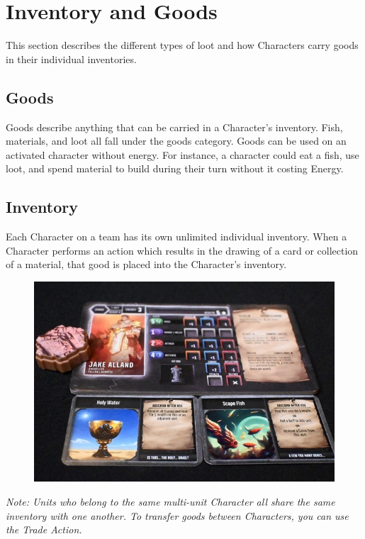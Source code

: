 \documentclass[../main.tex]{subfiles}
\begin{document}
\section{Inventory and Goods}
This section describes the different types of loot and how Characters carry goods in their individual inventories.

\subsection{Goods}
Goods describe anything that can be carried in a Character’s inventory. Fish, materials, and loot all fall under the goods category. Goods can be used on an activated character without energy. For instance,  a character could eat a fish, use loot, and spend material to build during their turn without it costing Energy.

\subsection{Inventory}
Each Character on a team has its own unlimited individual inventory. When a Character performs an action which results in the drawing of a card or collection of a material, that good is placed into the Character’s inventory. 

\begin{figure}[h]
    \centering
    \includegraphics[width=1\linewidth]{chapters//InventoryandGoods/TimeStrikeInventory.jpg}
\end{figure}

\textit{Note: Units who belong to the same multi-unit Character all share the same inventory with one another. To transfer goods between Characters, you can use the Trade Action.}
\end{document}
